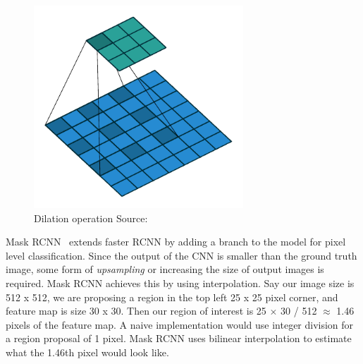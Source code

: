 \documentclass[12pt, a4paper, oneside, headinclude, footinclude]{article}
\begin{document}
\begin{figure}
    \centering
\includegraphics[width=0.7\textwidth]{conv_arithmetic/pdf/dilation_00.pdf}
    \caption[Dilation]{Dilation operation
    Source:~\cite{dumoulin2016guide} \label{fig:dilation}} 
\end{figure}

Mask RCNN~\cite{he2017} extends faster RCNN by adding a branch to the model
for pixel level classification.  Since the output of the CNN is smaller than
the ground truth image, some form of \textit{upsampling} or increasing the
size of output images is required.  Mask RCNN achieves this by using
interpolation. Say our image size is 512 x 512, we are proposing a region in
the top left 25 x 25 pixel corner, and feature map is size 30 x 30. Then our
region of interest is 25 $\times$ 30 / 512 $\approx$ 1.46 pixels of the
feature map. A naive implementation would use integer division for a region
proposal of 1 pixel. Mask RCNN uses bilinear interpolation to estimate what
the 1.46th pixel would look like.



\end{document}
